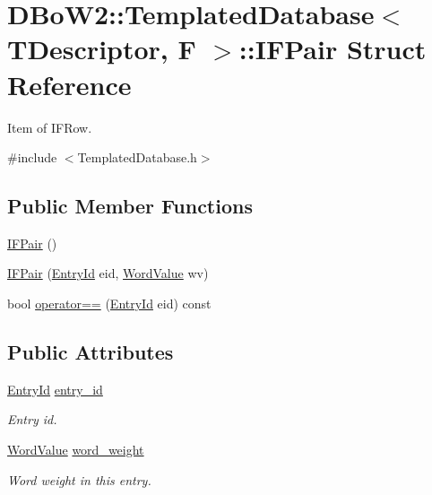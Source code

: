 \hypertarget{structDBoW2_1_1TemplatedDatabase_1_1IFPair}{}\section{D\+Bo\+W2\+:\+:Templated\+Database$<$ T\+Descriptor, F $>$\+:\+:I\+F\+Pair Struct Reference}
\label{structDBoW2_1_1TemplatedDatabase_1_1IFPair}


Item of I\+F\+Row.  




{\ttfamily \#include $<$Templated\+Database.\+h$>$}

\subsection*{Public Member Functions}
\begin{DoxyCompactItemize}
\item 
\hyperlink{structDBoW2_1_1TemplatedDatabase_1_1IFPair_af01918e869de76b592637b0fb4c55401}{I\+F\+Pair} ()
\item 
\hyperlink{structDBoW2_1_1TemplatedDatabase_1_1IFPair_a4d449ba7e48cab711302bd5752d65b1e}{I\+F\+Pair} (\hyperlink{namespaceDBoW2_a060a36cf320e6e831ee98915c19c1623}{Entry\+Id} eid, \hyperlink{namespaceDBoW2_a55fcd7333e591a38e96b91f41bc182f6}{Word\+Value} wv)
\item 
bool \hyperlink{structDBoW2_1_1TemplatedDatabase_1_1IFPair_a2186464d16abcec0d8b84a8636f333bd}{operator==} (\hyperlink{namespaceDBoW2_a060a36cf320e6e831ee98915c19c1623}{Entry\+Id} eid) const
\end{DoxyCompactItemize}
\subsection*{Public Attributes}
\begin{DoxyCompactItemize}
\item 
\mbox{\label{structDBoW2_1_1TemplatedDatabase_1_1IFPair_a4077b6061cdbb2afa1700b103f68f12e}} 
\hyperlink{namespaceDBoW2_a060a36cf320e6e831ee98915c19c1623}{Entry\+Id} \hyperlink{structDBoW2_1_1TemplatedDatabase_1_1IFPair_a4077b6061cdbb2afa1700b103f68f12e}{entry\+\_\+id}
\begin{DoxyCompactList}\small\item\em Entry id. \end{DoxyCompactList}\item 
\mbox{\label{structDBoW2_1_1TemplatedDatabase_1_1IFPair_adf30c55dc6ff22de69c360bcb8961a0c}} 
\hyperlink{namespaceDBoW2_a55fcd7333e591a38e96b91f41bc182f6}{Word\+Value} \hyperlink{structDBoW2_1_1TemplatedDatabase_1_1IFPair_adf30c55dc6ff22de69c360bcb8961a0c}{word\+\_\+weight}
\begin{DoxyCompactList}\small\item\em Word weight in this entry. \end{DoxyCompactList}\end{DoxyCompactItemize}


